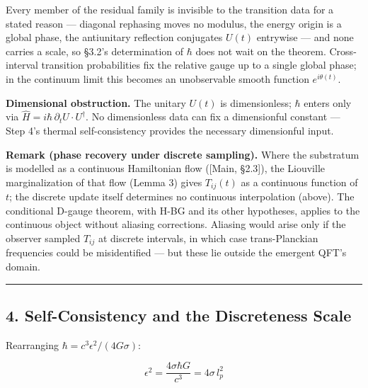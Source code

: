 \documentclass[
]{article}
\begin{document}
Every member of the residual family is invisible to the transition data
for a stated reason --- diagonal rephasing moves no modulus, the energy
origin is a global phase, the antiunitary reflection conjugates \(U(t)\)
entrywise --- and none carries a scale, so §3.2's determination of
\(\hbar\) does not wait on the theorem. Cross-interval transition
probabilities fix the relative gauge up to a single global phase; in the
continuum limit this becomes an unobservable smooth function
\(e^{i\theta(t)}\).

\textbf{Dimensional obstruction.} The unitary \(U(t)\) is dimensionless;
\(\hbar\) enters only via
\(\hat{H} = i\hbar \, \partial_t U \cdot U^\dagger\). No dimensionless
data can fix a dimensionful constant --- Step 4's thermal
self-consistency provides the necessary dimensionful input.

\textbf{Remark (phase recovery under discrete sampling).} Where the
substratum is modelled as a continuous Hamiltonian flow ({[}Main,
§2.3{]}), the Liouville marginalization of that flow (Lemma 3) gives
\(T_{ij}(t)\) as a continuous function of \(t\); the discrete update
itself determines no continuous interpolation (above). The conditional
D-gauge theorem, with H-BG and its other hypotheses, applies to the
continuous object without aliasing corrections. Aliasing would arise
only if the observer sampled \(T_{ij}\) at discrete intervals, in which
case trans-Planckian frequencies could be misidentified --- but these
lie outside the emergent QFT's domain.

\begin{center}\rule{0.5\linewidth}{0.5pt}\end{center}

\hypertarget{self-consistency-and-the-discreteness-scale}{%
\subsection{4. Self-Consistency and the Discreteness
Scale}\label{self-consistency-and-the-discreteness-scale}}

Rearranging \(\hbar = c^3 \epsilon^2 / (4G\sigma)\):

\[\epsilon^2 = \frac{4\sigma\hbar G}{c^3} = 4\sigma\,l_p^2\]
\end{document}
